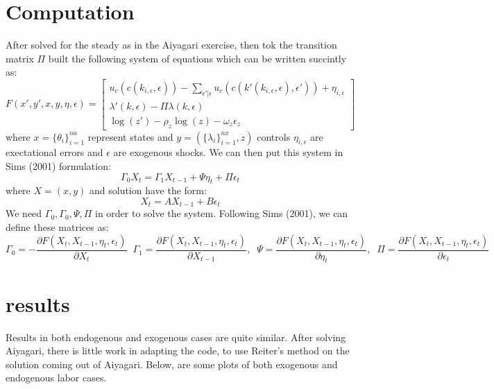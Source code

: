 \documentclass{article} %
\begin{document}
\section*{Computation}
After solved for the steady as in the Aiyagari exercise, then tok the transition matrix $\Pi$ built the following system of equations which can be written succintly as:
$$F(x',y',x,y,\eta,\epsilon) =
\left[ \begin{array}{cc} u_c(c(k_{i,\epsilon},\epsilon)) - \sum_{\epsilon'|\epsilon}u_c(c(k'(k_{i,\epsilon},\epsilon),\epsilon')) + \eta_{i,\epsilon} \\
    \lambda'(k,\epsilon) - \Pi\lambda(k,\epsilon)  \\
         \log( z') - \rho_z \log(z) - \omega_z \epsilon_z \end{array} \right]$$where $x=\{\theta_i\}_{i=1}^{na} $ represent states and $y=(\{\lambda_i\}_{i=1}^{nx},z)$ controls $\eta_{i,\epsilon}$ are exectational errors and $\epsilon$ are exogenous shocks. We can then put this system in Sims (2001) formulation:
     $$ \Gamma_0 X_{t} = \Gamma_1 X_{t-1} + \Psi \eta_t + \Pi \epsilon_t $$
where $X=(x,y)$ and solution have the form:
     $$X_t = A X_{t-1} + B\epsilon_t $$
     We need $\Gamma_0,\Gamma_0,\Psi,\Pi$ in order to solve the system. Following Sims (2001), we can define these matrices as:
     $$\Gamma_0 = -\frac{\partial F(X_t,X_{t-1},\eta_t,\epsilon_t)}{\partial X_t} \;\; \Gamma_1 = \frac{\partial F(X_t,X_{t-1},\eta_t,\epsilon_t)}{\partial X_{t-1}}, \;\; \Psi = \frac{\partial F(X_t,X_{t-1},\eta_t,\epsilon_t)}{\partial \eta_t}, \;\; \Pi = \frac{\partial F(X_t,X_{t-1},\eta_t,\epsilon_t)}{\partial \epsilon_t}$$
 \section*{results}
 Results in both endogenous and exogenous cases are quite similar. After solving Aiyagari, there is little work in adapting the code, to use Reiter's method on the solution coming out of Aiyagari. Below, are some plots of both exogenous and endogenous labor cases.     
\end{document}
